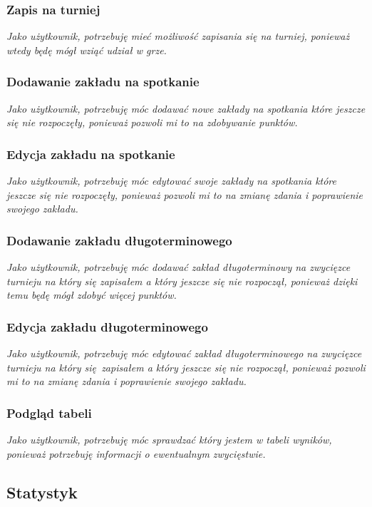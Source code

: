 \documentclass{mwrep}
\begin{document}
\subsubsection{Zapis na turniej}
\emph{Jako użytkownik, potrzebuję mieć możliwość zapisania się na turniej, ponieważ wtedy będę mógł wziąć udział w grze.}

\subsubsection{Dodawanie zakładu na spotkanie}
\emph{Jako użytkownik, potrzebuję móc dodawać nowe zakłady na spotkania które jeszcze się nie rozpoczęły, ponieważ pozwoli mi to na zdobywanie punktów.}

\subsubsection{Edycja zakładu na spotkanie}
\emph{Jako użytkownik, potrzebuję móc edytować swoje zakłady na spotkania które jeszcze się nie rozpoczęły, ponieważ pozwoli mi to na zmianę zdania i poprawienie swojego zakładu.}

\subsubsection{Dodawanie zakładu długoterminowego}
\emph{Jako użytkownik, potrzebuję móc dodawać zakład długoterminowy na zwycięzce turnieju na który się zapisałem a który jeszcze się nie rozpoczął, ponieważ dzięki temu będę mógł zdobyć więcej punktów.}

\subsubsection{Edycja zakładu długoterminowego}
\emph{Jako użytkownik, potrzebuję móc edytować zakład długoterminowego na zwycięzce turnieju na który się zapisałem a który jeszcze się nie rozpoczął, ponieważ pozwoli mi to na zmianę zdania i poprawienie swojego zakładu.}

\subsubsection{Podgląd tabeli}
\emph{Jako użytkownik, potrzebuję móc sprawdzać który jestem w tabeli wyników, ponieważ potrzebuję informacji o ewentualnym zwycięstwie.}

\subsection{Statystyk}
\end{document}
